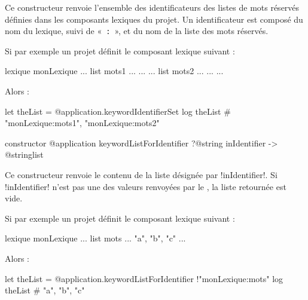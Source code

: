 Ce constructeur renvoie l'ensemble des identificateurs des listes de mots réservés définies dans les composants lexiques du projet. Un identificateur est composé du nom du lexique, suivi de «~\texttt{:}~», et du nom de la liste des mots réservés.


Si par exemple un projet définit le composant lexique suivant :

\begin{galgas}
lexique monLexique {
  ...
  list mots1 ... { ... }
  ...
  list mots2 ... { ... }
  ...
}
\end{galgas}

Alors :
\begin{galgas}
let theList = @application.keywordIdentifierSet
log theList # "monLexique:mots1", "monLexique:mots2"
\end{galgas}






\begin{galgasbox}
constructor @application keywordListForIdentifier
  ?@string inIdentifier
  -> @stringlist
\end{galgasbox}


Ce constructeur renvoie le contenu de la liste désignée par \ggs!inIdentifier!. Si \ggs!inIdentifier! n'est pas une des valeurs renvoyées par le , la liste retournée est vide.


Si par exemple un projet définit le composant lexique suivant :

\begin{galgas}
lexique monLexique {
  ...
  list mots ... { "a", "b", "c" }
  ...
}
\end{galgas}

Alors :
\begin{galgas}
let theList = @application.keywordListForIdentifier {!"monLexique:mots"}
log theList # "a", "b", "c"
\end{galgas}


